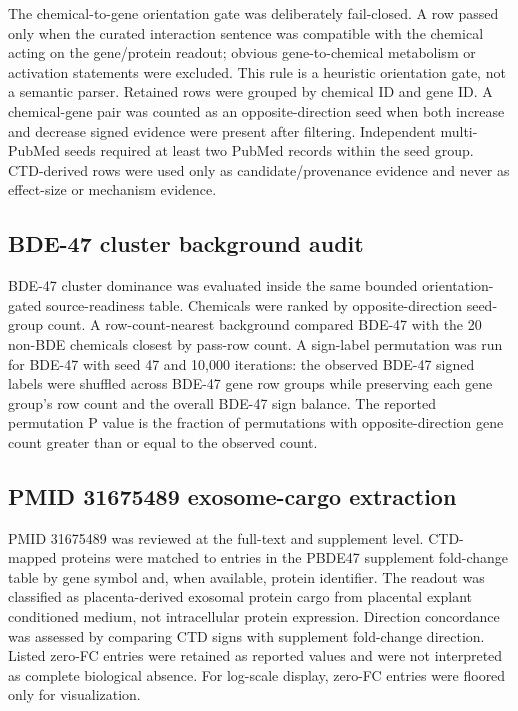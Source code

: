 \documentclass[11pt]{article}
\begin{document}
The chemical-to-gene orientation gate was deliberately fail-closed. A row passed only when the curated interaction sentence was compatible with the chemical acting on the gene/protein readout; obvious gene-to-chemical metabolism or activation statements were excluded. This rule is a heuristic orientation gate, not a semantic parser. Retained rows were grouped by chemical ID and gene ID. A chemical-gene pair was counted as an opposite-direction seed when both increase and decrease signed evidence were present after filtering. Independent multi-PubMed seeds required at least two PubMed records within the seed group. CTD-derived rows were used only as candidate/provenance evidence and never as effect-size or mechanism evidence.

\subsection{BDE-47 cluster background audit}
BDE-47 cluster dominance was evaluated inside the same bounded orientation-gated source-readiness table. Chemicals were ranked by opposite-direction seed-group count. A row-count-nearest background compared BDE-47 with the 20 non-BDE chemicals closest by pass-row count. A sign-label permutation was run for BDE-47 with seed 47 and 10,000 iterations: the observed BDE-47 signed labels were shuffled across BDE-47 gene row groups while preserving each gene group's row count and the overall BDE-47 sign balance. The reported permutation P value is the fraction of permutations with opposite-direction gene count greater than or equal to the observed count.

\subsection{PMID 31675489 exosome-cargo extraction}
PMID 31675489 was reviewed at the full-text and supplement level. CTD-mapped proteins were matched to entries in the PBDE47 supplement fold-change table by gene symbol and, when available, protein identifier. The readout was classified as placenta-derived exosomal protein cargo from placental explant conditioned medium, not intracellular protein expression. Direction concordance was assessed by comparing CTD signs with supplement fold-change direction. Listed zero-FC entries were retained as reported values and were not interpreted as complete biological absence. For log-scale display, zero-FC entries were floored only for visualization.
\end{document}
